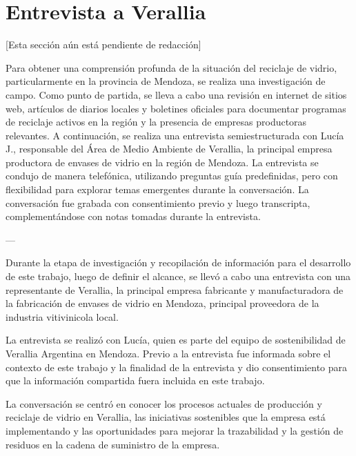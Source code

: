 \chapter{Entrevista a Verallia}
\label{cp:verallia-interview}

\parindent0pt

[Esta sección aún está pendiente de redacción]


Para obtener una comprensión profunda de la situación del reciclaje de vidrio, particularmente en la provincia de Mendoza, se realiza una investigación de campo.
Como punto de partida, se lleva a cabo una revisión en internet de sitios web, artículos de diarios locales y boletines oficiales para documentar programas de reciclaje activos en la región y la presencia de empresas productoras relevantes.
A continuación, se realiza una entrevista semiestructurada con Lucía J., responsable del Área de Medio Ambiente de Verallia, la principal empresa productora de envases de vidrio en la región de Mendoza.
La entrevista se condujo de manera telefónica, utilizando preguntas guía predefinidas, pero con flexibilidad para explorar temas emergentes durante la conversación.
La conversación fue grabada con consentimiento previo y luego transcripta, complementándose con notas tomadas durante la entrevista.

---

Durante la etapa de investigación y recopilación de información para el desarrollo de este trabajo, luego de definir el alcance, se llevó a cabo una entrevista con una representante de Verallia, la principal empresa fabricante y manufacturadora de la fabricación de envases de vidrio en Mendoza, principal proveedora de la industria vitivinicola local.

La entrevista se realizó con Lucía, quien es parte del equipo de sostenibilidad de Verallia Argentina en Mendoza. Previo a la entrevista fue informada sobre el contexto de este trabajo y la finalidad de la entrevista y dio consentimiento para que la información compartida fuera incluida en este trabajo. 

La conversación se centró en conocer los procesos actuales de producción y reciclaje de vidrio en Verallia, las iniciativas sostenibles que la empresa está implementando y las oportunidades para mejorar la trazabilidad y la gestión de residuos en la cadena de suministro de la empresa.

